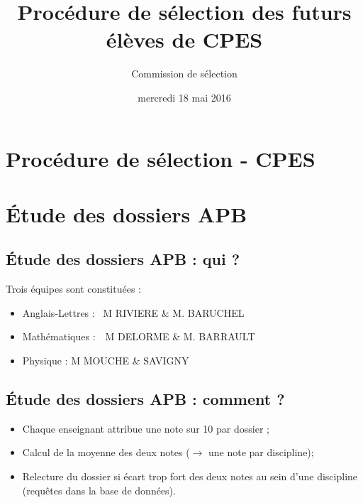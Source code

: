 \documentclass{beamer}
\title[]{Procédure de sélection des futurs élèves de CPES} %
\author{Commission de sélection}
\date{{mercredi 18 mai 2016}}
\begin{document}
\section{\hfill Procédure de sélection - CPES} %
\frame{\titlepage} %




\section{\'Etude des dossiers APB}
\subsection{\'Etude des dossiers APB : qui ?}
\begin{frame}
Trois équipes sont constituées :
  \begin{itemize}
  \item Anglais-Lettres :  \qquad\;\;\, M RIVIERE \& M. BARUCHEL 
  \item Mathématiques : \qquad \;\,\, M DELORME  \& M. BARRAULT  
  \item Physique :  \qquad \quad \qquad\; M MOUCHE \& SAVIGNY
  \end{itemize}
\end{frame}
\subsection{\'Etude des dossiers APB : comment ?}
\begin{frame}
\begin{itemize}
\item Chaque enseignant attribue une note sur 10 par dossier ; 
\item Calcul de la moyenne des deux notes ($\rightarrow$ une note par discipline);
\item Relecture du dossier si écart trop fort des deux notes au sein d'une discipline (requêtes dans la base de données).
\end{itemize}
\end{frame}
\end{document}
